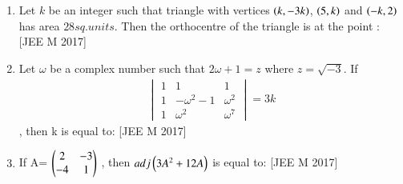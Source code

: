\documentclass[journal,,12pt,onecolumn]{IEEEtran}
\theoremstyle{remark}
\begin{document}
\begin{enumerate}
    \item Let $k$ be an integer such that triangle with vertices $\left(k,-3k\right)$, $\left(5,k\right)$ and $\left(-k,2\right)$ has area $28 sq. units$. Then the orthocentre of the triangle is at the point :
    \hfill{[JEE M 2017]}
    \begin{enumerate}
    \end{enumerate}
    \item Let $\omega$ be a complex number such that $2\omega + 1=z$ where $z=\sqrt{-3}$. If \begin{align}\begin{vmatrix}
1 & 1  & 1 \\
1 & -\omega^2-1 & \omega^2 \\
1 & \omega^2 & \omega^7 
\end{vmatrix}=3k \end{align}, then k is equal to:
\hfill{[JEE M 2017]}
\begin{enumerate}
\end{enumerate}
\item If A= $\begin{pmatrix}
    2 & -3 \\
    -4 & 1
\end{pmatrix}$
    , then $adj\left(3A^2+12A\right)$ is equal to:
\hfill{[JEE M 2017]}
\begin{enumerate}
\end{enumerate}
\end{enumerate}
\end{document}
